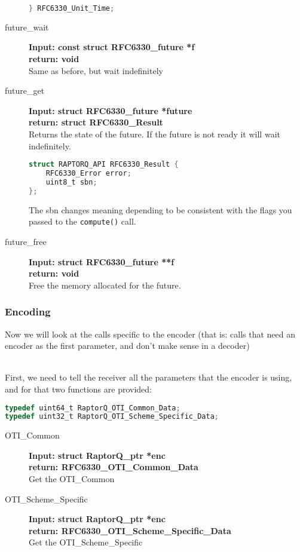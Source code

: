 \documentclass[11pt,a4paper]{refart}
\begin{document}
\begin{description}
\begin{lstlisting}[language=C]
} RFC6330_Unit_Time;
\end{lstlisting}
\item[future\_wait] \textbf{Input: const struct RFC6330\_future *f}\\
\textbf{return: void}\\
Same as before, but wait indefinitely
\item[future\_get] \textbf{Input: struct RFC6330\_future *future}\\
\textbf{return: struct RFC6330\_Result}\\
Returns the state of the future. If the future is not ready it will wait indefinitely.
\begin{lstlisting}[language=C]
struct RAPTORQ_API RFC6330_Result {
    RFC6330_Error error;
    uint8_t sbn;
};
\end{lstlisting}
The sbn changes meaning depending to be consistent with the flags you passed to the \texttt{compute()} call.
\item[future\_free] \textbf{Input: struct RFC6330\_future **f}\\
\textbf{return: void}\\
Free the memory allocated for the future.
\end{description}

\subsubsection{\textbf{Encoding}}
Now we will look at the calls specific to the encoder (that is: calls that need an encoder as the first parameter, and don't make sense in a decoder)

\\
First, we need to tell the receiver all the parameters that the encoder is using, and for that two functions are provided:
\begin{lstlisting}[language=C]
typedef uint64_t RaptorQ_OTI_Common_Data;
typedef uint32_t RaptorQ_OTI_Scheme_Specific_Data;
\end{lstlisting}
\begin{description}
\item[OTI\_Common]\textbf{Input: struct RaptorQ\_ptr *enc}\\
\textbf{return: RFC6330\_OTI\_Common\_Data}\\
Get the OTI\_Common
\item[OTI\_Scheme\_Specific]\textbf{Input: struct RaptorQ\_ptr *enc}\\
\textbf{return: RFC6330\_OTI\_Scheme\_Specific\_Data}\\
Get the OTI\_Scheme\_Specific
\end{description}
\end{document}
